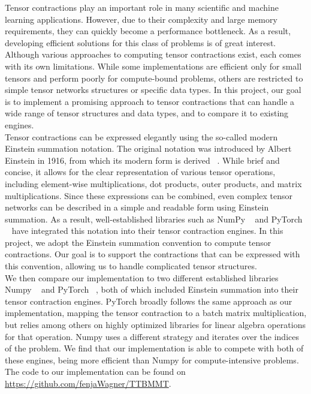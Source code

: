 Tensor contractions play an important role in many scientific and machine learning applications. However, due to their complexity and large memory requirements, they can quickly become a performance bottleneck. 
As a result, developing efficient solutions for this class of problems is of great interest. \\
Although various approaches to computing tensor contractions exist, each comes with its own limitations. While some implementations are efficient only for small tensors and perform poorly for compute-bound problems, others are restricted to simple tensor networks structures or specific data types. In this project, our goal is to implement a promising approach to tensor contractions that can handle a wide range of tensor structures and data types, and to compare it to existing engines.\\

\noindent Tensor contractions can be expressed elegantly using the so-called modern Einstein summation notation. The original notation was introduced by Albert Einstein in 1916, from which its modern form is derived ~\cite{einstein}. While brief and concise, it allows for the clear representation of various tensor operations, including element-wise multiplications, dot products, outer products, and matrix multiplications. Since these expressions can be combined, even complex tensor networks can be described in a simple and readable form using Einstein summation. As a result, well-established libraries such as NumPy ~\cite{Numpy} and PyTorch ~\cite{PyTorch} have integrated this notation into their tensor contraction engines. In this project, we adopt the Einstein summation convention to compute tensor contractions. Our goal is to support the contractions that can be expressed with this convention, allowing us to handle complicated tensor structures.\\

\noindent We then compare our implementation to two different established libraries Numpy ~\cite{Numpy} and PyTorch ~\cite{PyTorch}, both of which included Einstein summation into their tensor contraction engines. PyTorch broadly follows the same approach as our implementation, mapping the tensor contraction to a batch matrix multiplication, but relies among others on highly optimized libraries for linear algebra operations for that operation. Numpy uses a different strategy and iterates over the indices of the problem. We find that our implementation is able to compete with both of these engines, being more efficient than Numpy for compute-intensive problems.
 The code to our implementation can be found on \url{https://github.com/fenjaWagner/TTBMMT}.\\
 
